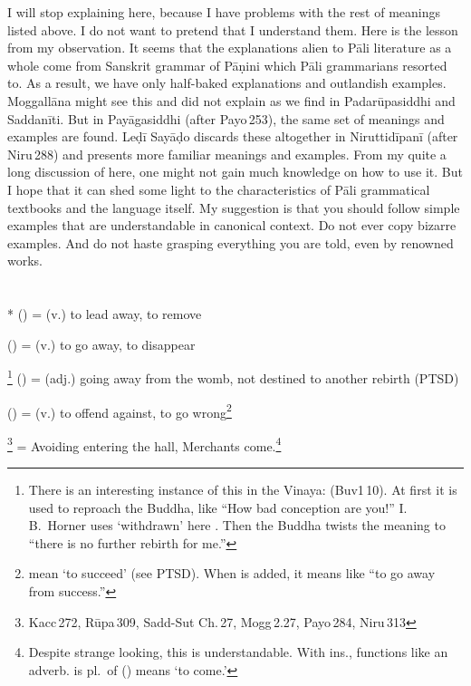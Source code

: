 I will stop explaining  here, because I have problems with the rest of meanings listed above. I do not want to pretend that I understand them. Here is the lesson from my observation. It seems that the explanations alien to P\=ali literature as a whole come from Sanskrit grammar of P\=a\d nini which P\=ali grammarians resorted to. As a result, we have only half-baked explanations and outlandish examples. Moggall\=ana might see this and did not explain  as we find in Padar\=upasiddhi and Saddan\=iti. But in Pay\=agasiddhi (after Payo\,253), the same set of meanings and examples are found. Le\d d\=i Say\=a\d do discards these altogether in Niruttid\=ipan\=i (after Niru\,288) and presents more familiar meanings and examples. From my quite a long discussion of  here, one might not gain much knowledge on how to use it. But I hope that it can shed some light to the characteristics of P\=ali grammatical textbooks and the language itself. My suggestion is that you should follow simple examples that are understandable in canonical context. Do not ever copy bizarre examples. And do not haste grasping everything you are told, even by renowned works.

\section*{}\label{upasagga:apa}
\begin{compactitem}
\item {}* () = (v.) to lead away, to remove
\item {} () = (v.) to go away, to disappear 
\item {}\footnote{There is an interesting instance of this in the Vinaya:  (Buv1\,10). At first it is used to reproach the Buddha, like ``How bad conception are you!'' I.\,B.\ Horner uses `withdrawn' here \citep[p.~88]{horner:discipline}. Then the Buddha twists the meaning to ``there is no further rebirth for me.''} () = (adj.) going away from the womb, not destined to another rebirth (PTSD)
\item {} () = (v.) to offend against, to go wrong\footnote{ mean `to succeed' (see PTSD). When  is added, it means like ``to go away from success.''} 
\item {}\footnote{Kacc\,272, R\=upa\,309, Sadd-Sut Ch.\,27, Mogg\,2.27, Payo\,284, Niru\,313} = Avoiding entering the hall, Merchants come.\footnote{Despite strange looking, this is understandable. With ins.,  functions like an adverb.  is pl.\ of  () means `to come.'}
\end{compactitem}

